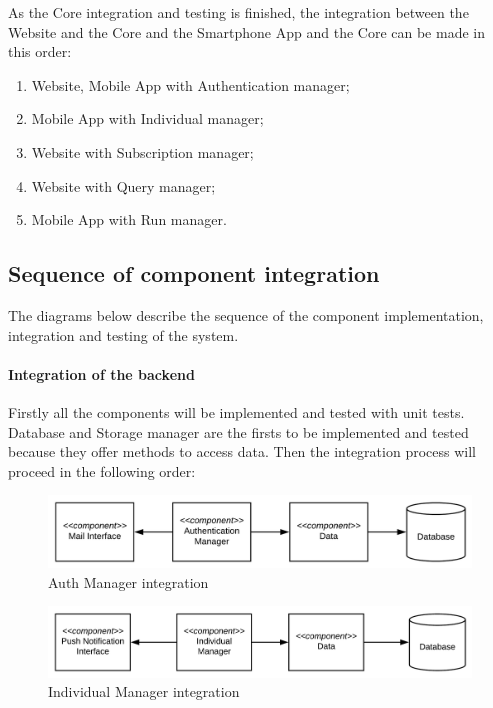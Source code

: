 As the Core integration and testing is finished, the integration between the Website and the Core and the Smartphone App and the Core can be made in this order:
\begin{enumerate}
    \item Website, Mobile App with Authentication manager;
    \item Mobile App with Individual manager;
    \item Website with Subscription manager;
    \item Website with Query manager;
    \item Mobile App with Run manager.
\end{enumerate}













\subsection{Sequence of component integration}
The diagrams below describe the sequence of the component implementation, integration and testing of the system.

\paragraph{Integration of the backend}
Firstly all the components will be implemented and tested with unit tests.
Database and Storage manager are the firsts to be implemented and tested because they offer methods to access data.
Then the integration process will proceed in the following order:





\begin{figure}[H]
	\includegraphics[width=\textwidth,height=\textheight,keepaspectratio]{assets/integration/AuthDataMail.pdf}
	\caption{Auth Manager integration}
	\label{fig:AuthDataMail}
\end{figure}



\begin{figure}[H]
	\includegraphics[width=\textwidth,height=\textheight,keepaspectratio]{assets/integration/IndividualPush.pdf}
	\caption{Individual Manager integration}
	\label{fig:IndividualPush}
\end{figure}

